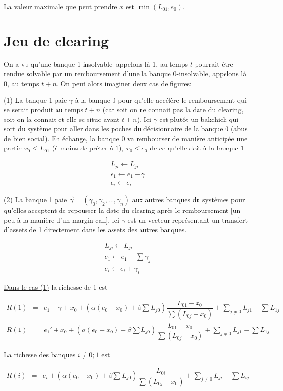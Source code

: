 \documentclass{article}
\def\AR#1{
\[
\begin{array}{llllllll}
#1
\end{array}
\]
}
\begin{document}
La valeur maximale que peut prendre $x$ 
est $\min(L_{01},e_0)$.

\section{Jeu de clearing}
On a vu qu'une banque 1-insolvable, appelons là 1, au temps $t$ pourrait être rendue solvable par un remboursement d'une la banque 0-insolvable, appelons là 0, au temps $t+n$. On peut alors imaginer deux cas de figures:

(1) La banque 1 paie $\gamma$ à la banque 0 pour qu'elle accélère le remboursement qui se serait produit au temps $t+n$ (car soit on ne connait pas la date du clearing, soit on la connait et elle se situe avant $t+n$). Ici $\gamma$ est plutôt un bakchich qui sort du système pour aller dans les poches du décisionnaire de la banque $0$ (abus de bien social). En échange, la banque $0$ va rembourser de manière anticipée une partie $x_0\leq L_{01}$ (à moins de prêter à $1$), 
$x_0\leq e_0$ de ce qu'elle doit à la banque $1$.

\AR{
L_{ji} \leftarrow L_{ji}
\\
e_{1} \leftarrow e_{1} - \gamma
\\
e_{i} \leftarrow e_{i} 
}

(2) La banque 1 paie $\vec \gamma = (\gamma_0, \gamma_2, \ldots, \gamma_n)$ aux autres banques du systèmes pour qu'elles acceptent de repousser la date du clearing après le remboursement [un peu à la manière d'un margin call]. Ici $\gamma$ est un vecteur représentant un transfert d'assets de 1 directement dans les assets des autres banques.

\AR{
L_{ji} \leftarrow L_{ji}
\\
e_{1} \leftarrow e_{1} - \sum \gamma_j
\\
e_{i} \leftarrow e_{i} + \gamma_i
}


\underline{Dans le cas (1)} la richesse de 1 est

\AR{
R(1) 
&=&
e_1 -
\gamma +
x_0 +
(\alpha (e_0 - x_0) + \beta \sum L_{j0})
 \dfrac
{L_{01}- x_0}
{\sum (L_{0j} - x_0)} + 
\sum_{j \neq 0} L_{j1}-
\sum L_{1j}
\\
R(1) 
&=&
e_1' +
x_0 +
(\alpha (e_0 - x_0) + \beta \sum L_{j0})
 \dfrac
{L_{01}- x_0}
{\sum (L_{0j} - x_0)} + 
\sum_{j \neq 0} L_{j1}-
\sum L_{1j}
}

La richesse des banques $i\neq 0; 1$ est : 

\AR{
R(i) 
&=&
e_i +
(\alpha (e_0 - x_0) + \beta \sum L_{j0})
 \dfrac
{L_{0i}}
{\sum (L_{0j} - x_0)} + 
\sum_{j \neq 0} L_{ji}-
\sum L_{ij}
}
\end{document}
